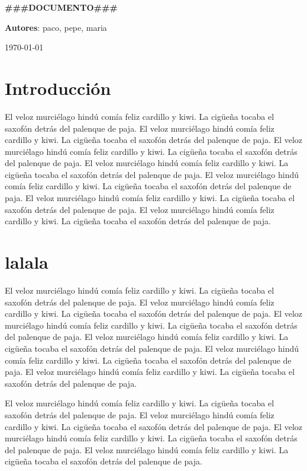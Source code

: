 \documentclass[a4paper,11pt,oneside]{article}
\begin{document}
\pagestyle{fancy}


\begin{center}
{\Large \textbf{\#\#\#DOCUMENTO\#\#\#}}

{\large \textbf{Autores}: paco, pepe, maria}

{\large \today}
\end{center}


\section{Introducción}

El veloz murciélago hindú comía feliz cardillo y kiwi. La cigüeña tocaba el
saxofón detrás del palenque de paja.
El veloz murciélago hindú comía feliz cardillo y kiwi. La cigüeña tocaba el
saxofón detrás del palenque de paja.
El veloz murciélago hindú comía feliz cardillo y kiwi. La cigüeña tocaba el
saxofón detrás del palenque de paja.
El veloz murciélago hindú comía feliz cardillo y kiwi. La cigüeña tocaba el
saxofón detrás del palenque de paja.
El veloz murciélago hindú comía feliz cardillo y kiwi. La cigüeña tocaba el
saxofón detrás del palenque de paja.
El veloz murciélago hindú comía feliz cardillo y kiwi. La cigüeña tocaba el
saxofón detrás del palenque de paja.
El veloz murciélago hindú comía feliz cardillo y kiwi. La cigüeña tocaba el
saxofón detrás del palenque de paja.

\section{lalala}
El veloz murciélago hindú comía feliz cardillo y kiwi. La cigüeña tocaba el
saxofón detrás del palenque de paja.
El veloz murciélago hindú comía feliz cardillo y kiwi. La cigüeña tocaba el
saxofón detrás del palenque de paja.
El veloz murciélago hindú comía feliz cardillo y kiwi. La cigüeña tocaba el
saxofón detrás del palenque de paja.
El veloz murciélago hindú comía feliz cardillo y kiwi. La cigüeña tocaba el
saxofón detrás del palenque de paja.
El veloz murciélago hindú comía feliz cardillo y kiwi. La cigüeña tocaba el
saxofón detrás del palenque de paja.
El veloz murciélago hindú comía feliz cardillo y kiwi. La cigüeña tocaba el
saxofón detrás del palenque de paja.

El veloz murciélago hindú comía feliz cardillo y kiwi. La cigüeña tocaba el
saxofón detrás del palenque de paja.
El veloz murciélago hindú comía feliz cardillo y kiwi. La cigüeña tocaba el
saxofón detrás del palenque de paja.
El veloz murciélago hindú comía feliz cardillo y kiwi. La cigüeña tocaba el
saxofón detrás del palenque de paja.
El veloz murciélago hindú comía feliz cardillo y kiwi. La cigüeña tocaba el
saxofón detrás del palenque de paja.
\end{document}
